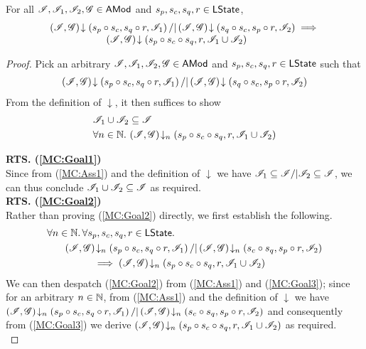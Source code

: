 \begin{lemma}\label{lem:merge-closure}
For all $\mathscr{I}, \mathscr{I}_1, \mathscr{I}_2, \mathscr{G} \in \textsf{AMod}$ and $s_p, s_c, s_q, r \in \textsf{LState}$,
%
\[
\begin{array}{l}
	\left(\mathscr{I}, \mathscr{G}\right) \!\downarrow \left(s_p \circ s_c, s_q \circ r, \mathscr{I}_{1}\right) /| \left(\mathscr{I}, \mathscr{G}\right) \!\downarrow \left(s_q \circ s_c, s_p \circ r, \mathscr{I}_{2}\right)
	\implies\\
	\hspace*{2cm} \left(\mathscr{I}, \mathscr{G}\right) \!\downarrow \left(s_p \circ s_c \circ s_q, r, \mathscr{I}_{1} \cup \mathscr{I}_{2}\right)
\end{array}
\]
%
\begin{proof} Pick an arbitrary $\mathscr{I}, \mathscr{I}_1, \mathscr{I}_2, \mathscr{G} \in \textsf{AMod}$ and $s_p, s_c, s_q, r \in \textsf{LState}$ such that 
%
\begin{align}
	\left(\mathscr{I}, \mathscr{G}\right) \!\downarrow \left(s_p \circ s_c, s_q \circ r, \mathscr{I}_{1}\right) /| \left(\mathscr{I}, \mathscr{G}\right) \!\downarrow \left(s_q \circ s_c, s_p \circ r, \mathscr{I}_{2}\right) \label{MC:Ass1}
\end{align} 
%
From the definition of $\downarrow$, it then suffices to show
%
\begin{align}
	& \mathscr{I}_1 \cup \mathscr{I}_2  \subseteq \mathscr{I} \label{MC:Goal1}\\
	& \forall n \in \mathbb{N}.\,  \left(\mathscr{I}, \mathscr{G}\right) \!\downarrow_{n} \left(s_p \circ s_c \circ s_q, r, \mathscr{I}_{1} \cup \mathscr{I}_{2}\right) \label{MC:Goal2}
\end{align}
%

\noindent\textbf{RTS. (\ref{MC:Goal1})} \\
Since from (\ref{MC:Ass1}) and the definition of $\downarrow$ we have $\mathscr{I}_1 \subseteq \mathscr{I} /| \mathscr{I}_2 \subseteq \mathscr{I}$, we can thus conclude $\mathscr{I}_1 \cup \mathscr{I}_2 \subseteq \mathscr{I}$ as required. \\

\noindent\textbf{RTS. (\ref{MC:Goal2})} \\
Rather than proving (\ref{MC:Goal2}) directly, we first establish the following.
%
\begin{align}
	\for {n \in \Nats} \for{s_p, s_c, s_q, r \in \LStates} & \nonumber\\
	& \hspace{-4cm}\extendsAMUpto{\lmod, \gmod}{n}{s_p \composeL s_c}{s_q \composeL r}{\lmod_1} /| \extendsAMUpto{\lmod, \gmod}{n}{s_c \composeL s_q}{s_p \composeL r}{\lmod_2} \nonumber\\
	& \hspace{-3cm} \implies \extendsAMUpto{\lmod, \gmod}{n}{s_p \composeL s_c \composeL s_q}{r}{\lmod_1 \cup \lmod_2} \label{MC:Goal3}
\end{align}
%
We can then despatch (\ref{MC:Goal2}) from (\ref{MC:Ass1}) and (\ref{MC:Goal3}); since for an arbitrary $n \in \mathbb{N}$, from (\ref{MC:Ass1}) and the definition of $\downarrow$ we have $\left(\mathscr{I}, \mathscr{G}\right) \!\downarrow_{n} \left(s_p \circ s_c, s_q \circ r, \mathscr{I}_1\right) /| \left(\mathscr{I}, \mathscr{G}\right) \!\downarrow_{n} \left(s_c \circ s_q, s_p \circ r, \mathscr{I}_2\right)$ and consequently from (\ref{MC:Goal3}) we derive $\left(\mathscr{I}, \mathscr{G}\right) \!\downarrow_{n} \left(s_p \circ s_c \circ s_q, r, \mathscr{I}_1 \cup \mathscr{I}_2\right)$ as required. \\


\end{proof}
\end{lemma}
